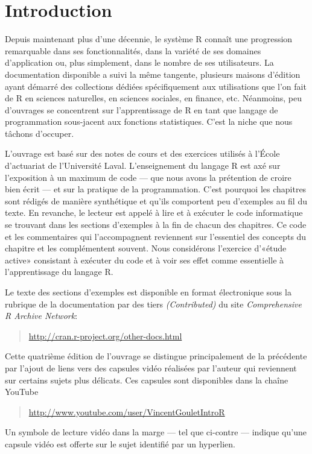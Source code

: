 \chapter*{Introduction}

Depuis maintenant plus d'une décennie, le système R connaît une
progression remarquable dans ses fonctionnalités, dans la variété de
ses domaines d'application ou, plus simplement, dans le nombre de ses
utilisateurs. La documentation disponible a suivi la même tangente,
plusieurs maisons d'édition ayant démarré des collections dédiées
spécifiquement aux utilisations que l'on fait de R en sciences
naturelles, en sciences sociales, en finance, etc. Néanmoins, peu
d'ouvrages se concentrent sur l'apprentissage de R en tant que langage
de programmation sous-jacent aux fonctions statistiques. C'est la
niche que nous tâchons d'occuper.

L'ouvrage est basé sur des notes de cours et des exercices utilisés à
l'École d'actuariat de l'Université Laval. L'enseignement du langage R
est axé sur l'exposition à un maximum de code --- que nous avons la
prétention de croire bien écrit --- et sur la pratique de la
programmation. C'est pourquoi les chapitres sont rédigés de manière
synthétique et qu'ils comportent peu d'exemples au fil du texte. En
revanche, le lecteur est appelé à lire et à exécuter le code
informatique se trouvant dans les sections d'exemples à la fin de
chacun des chapitres. Ce code et les commentaires qui l'accompagnent
reviennent sur l'essentiel des concepts du chapitre et les
complémentent souvent. Nous considérons l'exercice d'«étude active»
consistant à exécuter du code et à voir ses effet comme essentielle à
l'apprentissage du langage R.

Le texte des sections d'exemples est disponible en format électronique
sous la rubrique de la documentation par des tiers
\emph{(Contributed)} du site \emph{Comprehensive R Archive Network}:
\begin{quote}
  \url{http://cran.r-project.org/other-docs.html}
\end{quote}

Cette quatrième édition de l'ouvrage se distingue principalement de la
précédente par l'ajout de liens vers des capsules vidéo réalisées par
l'auteur qui reviennent sur certains sujets plus délicats. Ces
capsules sont disponibles dans la chaîne YouTube
\begin{quote}
  \url{http://www.youtube.com/user/VincentGouletIntroR}
\end{quote}
Un symbole \marginpar{\raisebox{-14pt}[0em][0em]{\video}} de lecture
vidéo dans la marge --- tel que ci-contre --- indique qu'une capsule
vidéo est offerte sur le {\color{url} sujet} identifié par un
hyperlien.

